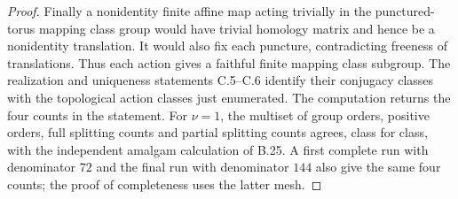 \begin{proof}
Finally a nonidentity finite affine map acting trivially in the
punctured-torus mapping class group would have trivial homology
matrix and hence be a nonidentity translation.  It would also fix
each puncture, contradicting freeness of translations.  Thus each
action gives a faithful finite mapping class subgroup.  The realization
and uniqueness statements C.5--C.6 identify their conjugacy classes
with the topological action classes just enumerated.  The computation
returns the four counts in the statement.  For $\nu=1$, the multiset
of group orders, positive orders, full splitting counts and partial
splitting counts agrees, class for class, with the independent
amalgam calculation of B.25.  A first complete run with denominator
$72$ and the final run with denominator $144$ also give the same
four counts; the proof of completeness uses the latter mesh.
\end{proof}
